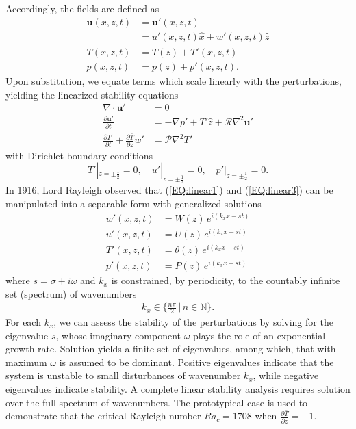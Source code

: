 \documentclass[reprint,amsmath,amssymb,aps]{revtex4-1}
\begin{document}
Accordingly, the fields are defined as
\begin{align}
    \mathbf{u}(x, z, t) &= \mathbf{u'}(x, z, t) \label{EQ:reynolds_dc_u}\\
    &= u'(x, z, t)\hat{x} + w'(x, z, t)\hat{z} \\
    T(x, z, t) &= \bar{T}(z) + T'(x, z, t) \label{EQ:reynolds_dc_T}\\
    p(x, z, t) &= \bar{p}(z) + p'(x, z, t).
\end{align}
Upon substitution, we equate terms which scale linearly with the perturbations, yielding the linearized stability equations
\begin{align}
    \nabla \cdot \mathbf{u'} &= 0 \label{EQ:linear1}\\
    \frac{\partial\mathbf{u'}}{\partial t} &= - \nabla p' + T'\hat{z} + \mathcal{R} \nabla^2 \mathbf{u'} \label{EQ:linear2}\\
    \frac{\partial T'}{\partial t} + \frac{\partial \bar{T}}{\partial z} w' &= \mathcal{P} \nabla^2 T' \label{EQ:linear3}
\end{align}
with Dirichlet boundary conditions 
\begin{equation}
    T'|_{z = \pm \frac{1}{2}} = 0, \quad u'|_{z = \pm \frac{1}{2}} = 0, \quad p'|_{z = \pm \frac{1}{2}} = 0.
\end{equation}
In 1916, Lord Rayleigh observed that (\ref{EQ:linear1}) and (\ref{EQ:linear3}) can be manipulated into a separable form with generalized solutions
\begin{align}
    w'(x, z, t) &= W(z) \, e^{i(k_xx-st)} \label{EQ:normal_modes1}\\ 
    u'(x, z, t) &= U(z) \, e^{i(k_xx-st)} \label{EQ:normal_modes2}\\ 
    T'(x, z, t) &= \theta(z) \, e^{i(k_xx-st)} \label{EQ:normal_modes3}\\ 
    p'(x, z, t) &= P(z) \, e^{i(k_xx-st)}\label{EQ:normal_modes4}
\end{align}
where $s = \sigma + i\omega$ and $k_x$ is constrained, by periodicity, to the countably infinite set (spectrum) of wavenumbers
\begin{align}
    k_x \in \big\{\frac{n\pi}{2} \, \big| \, n \in \mathbb{N}\big\}.
\end{align}
For each $k_x$, we can assess the stability of the perturbations by solving for the eigenvalue $s$, whose imaginary component $\omega$ plays the role of an exponential growth rate. Solution yields a finite set of eigenvalues, among which, that with maximum $\omega$ is assumed to be dominant. Positive eigenvalues indicate that the system is unstable to small disturbances of wavenumber $k_x$, while negative eigenvalues indicate stability. A complete linear stability analysis requires solution over the full spectrum of wavenumbers. The prototypical case is used to demonstrate that the critical Rayleigh number $Ra_c = 1708$ when $\frac{\partial \bar{T}}{\partial z} = -1$.
\end{document}
